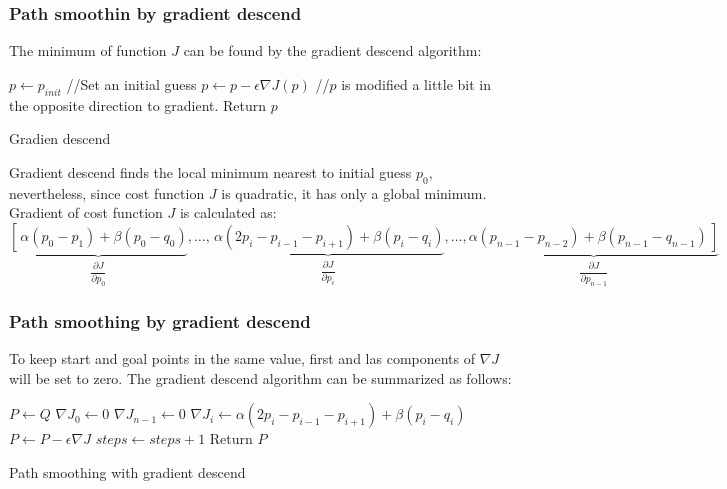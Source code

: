 \begin{frame}\frametitle{Path smoothin by gradient descend}
  The minimum of function $J$ can be found by the gradient descend algorithm:
  \begin{algorithm}[H]
    \footnotesize
  \DontPrintSemicolon
  $p\leftarrow p_{init}$ //Set an initial guess\;
  {
    $p \leftarrow p - \epsilon \nabla J (p)$ //$p$ is modified a little bit in the opposite direction to gradient.\;
  }
  Return  $p$
  \caption{Gradien descend}
\end{algorithm}
\[\]
Gradient descend finds the local minimum nearest to initial guess $p_0$, nevertheless, since cost function $J$ is quadratic, it has only a global minimum. Gradient of cost function $J$ is calculated as:
  \[\underbrace{\left[\frac{}{}\alpha(p_0 - p_1)+\beta(p_0 - q_0)\right. }_{\dfrac{\partial J}{\partial p_0}}
,\dots ,
\underbrace{\frac{}{}\alpha(2p_i - p_{i-1} - p_{i+1})+\beta(p_i - q_i)}_{\dfrac{\partial J}{\partial p_i}}
,\dots ,
\underbrace{\left.\alpha(p_{n-1} - p_{n-2})+\beta(p_{n-1}-q_{n-1})\frac{}{}\right]}_{\dfrac{\partial J}{\partial p_{n-1}}}
\]
\end{frame}

\begin{frame}\frametitle{Path smoothing by gradient descend}
  To keep start and goal points in the same value, first and las components of $\nabla J$ will be set to zero. The gradient descend algorithm can be summarized as follows:
  \[\]
\begin{algorithm}[H]
\DontPrintSemicolon
  \DontPrintSemicolon
  $P \leftarrow Q$\;
  $\nabla J_0 \leftarrow 0$\;
  $\nabla J_{n-1} \leftarrow 0$\;   
  {
    \ForEach{$i \in [1,n-1)$}
    {
      $\nabla J_i \leftarrow \alpha (2p_i - p_{i-1} - p_{i+1}) + \beta (p_i - q_i)$\;
    }
    $P \leftarrow P - \epsilon \nabla J$\;
    $steps \leftarrow steps + 1$
  }
  Return $P$
  \caption{Path smoothing with gradient descend}
\end{algorithm}
\end{frame}

